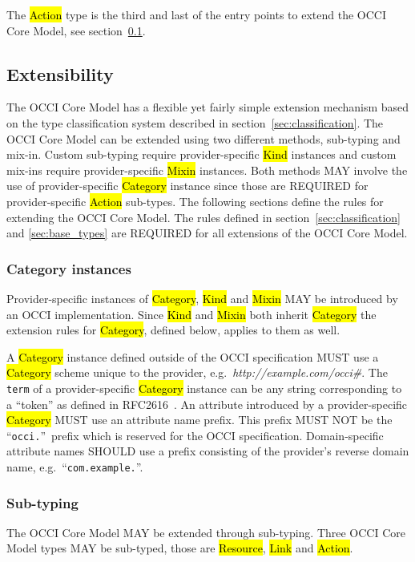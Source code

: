 \documentclass[10pt,a4paper]{article}
\begin{document}
The \hl{Action} type is the third and last of the entry points to extend the
OCCI Core Model, see section~\ref{sec:extensibility}.

\subsection{Extensibility}
\label{sec:extensibility}
The OCCI Core Model has a flexible yet fairly simple extension mechanism based on
the type classification system described in section~\ref{sec:classification}.
%
The OCCI Core Model can be extended using two different methods, sub-typing and
mix-in. Custom sub-typing require provider-specific \hl{Kind} instances and
custom mix-ins require provider-specific \hl{Mixin} instances.  Both methods MAY
involve the use of provider-specific \hl{Category} instance since those are
REQUIRED for provider-specific \hl{Action} sub-types.  The following sections
define the rules for extending the OCCI Core Model.
%
The rules defined in section~\ref{sec:classification} and \ref{sec:base_types}
are REQUIRED for all extensions of the OCCI Core Model.

\subsubsection{Category instances}
\label{sec:ext:category}
Provider-specific instances of \hl{Category}, \hl{Kind} and \hl{Mixin} MAY be
introduced by an OCCI implementation. Since \hl{Kind} and \hl{Mixin} both
inherit \hl{Category} the extension rules for \hl{Category}, defined below,
applies to them as well.

A \hl{Category} instance defined outside of the OCCI specification MUST use a
\hl{Category} scheme unique to the provider,
e.g.~\textit{http://example.com/occi\#}. The {\tt term} of a provider-specific
\hl{Category} instance can be any string corresponding to a ``token'' as defined
in RFC2616~\cite{rfc2616}.
%
An attribute introduced by a provider-specific \hl{Category} MUST
use an attribute name prefix. This prefix MUST NOT be the ``\texttt{occi.}''~prefix
which is reserved for the OCCI specification. Domain-specific attribute names
SHOULD use a prefix consisting of the provider's reverse domain name,
e.g.~``\texttt{com.example.}''.

\subsubsection{Sub-typing}
The OCCI Core Model MAY be extended through sub-typing.
Three OCCI Core Model types MAY be sub-typed, those are \hl{Resource}, \hl{Link} and
\hl{Action}.
\end{document}
